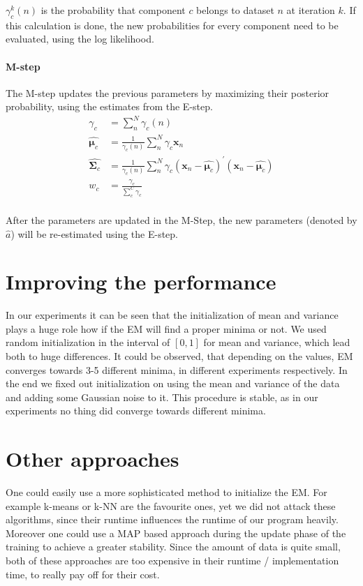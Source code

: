 $\gamma_c^k(n)$ is the probability that component $c$ belongs to dataset $n$ at iteration $k$. If this calculation is done, the new probabilities for every component need to be evaluated, using the log likelihood.
\paragraph*{M-step}
The M-step updates the previous parameters by maximizing their posterior probability, using the estimates from the E-step.
\begin{equation}
\begin{split}
\gamma_c &= \sum\limits_n^N \gamma_{c}(n) \\
\hat{\boldsymbol{\mu}_c} &=\frac{1}{\gamma_c(n)} \sum\limits_n^N \gamma_c \mathbf{x}_n \\
\hat{\mathbf{\Sigma}_c} &=\frac{1}{\gamma_c(n)} \sum\limits_n^N \gamma_c \left( \mathbf{x}_n - \hat{\boldsymbol{\mu}_c} \right)^{'} \left( \mathbf{x}_n - \hat{\boldsymbol{\mu}_c} \right) \\
w_c &= \frac{\gamma_c}{\sum\limits_c^C \gamma_c} \\
\end{split}
\end{equation}

After the parameters are updated in the M-Step, the new parameters (denoted by $\hat{a} $) will be re-estimated using the E-step.

\section{Improving the performance}
In our experiments it can be seen that the initialization of mean and variance plays a huge role how if the EM will find a proper minima or not. We used random initialization in the interval of $ [0,1]$ for mean and variance, which lead both to huge differences. It could be observed, that depending on the values, EM converges towards 3-5 different minima, in different experiments respectively.
In the end we fixed out initialization on using the mean and variance of the data and adding some Gaussian noise to it. This procedure is stable, as in our experiments no thing did converge towards different minima.


\section{Other approaches}
One could easily use a more sophisticated method to initialize the EM. For example k-means or k-NN are the favourite ones, yet we did not attack these algorithms, since their runtime influences the runtime of our program heavily. Moreover one could use a MAP based approach during the update phase of the training to achieve a greater stability.
Since the amount of data is quite small, both of these approaches are too expensive in their runtime / implementation time, to really pay off for their cost.